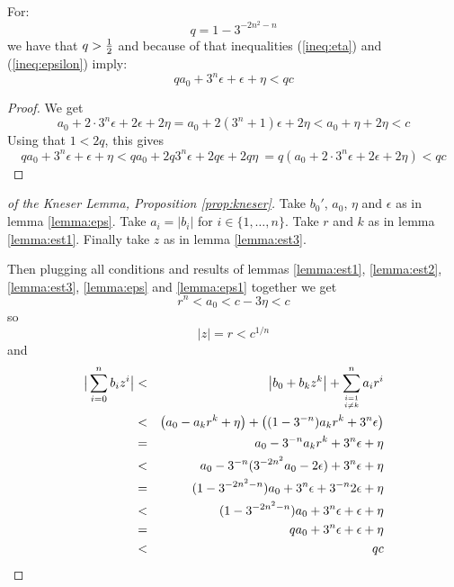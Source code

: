 \begin{lemma}\label{lemma:eps1}
For:
$$q = 1 - 3^{-2n^2-n}$$
we have that $q > {1\over 2}$ and because of that
inequalities (\ref{ineq:eta}) and (\ref{ineq:epsilon}) imply:
$$q a_0 + 3^n \epsilon + \epsilon + \eta < qc$$
\end{lemma}
\begin{proof}
We get
$$a_0 + 2\cdot 3^n\epsilon + 2\epsilon + 2\eta = a_0 + 2(3^n + 1)\epsilon + 2\eta < a_0 + \eta + 2\eta < c$$
Using that $1 < 2q$, this gives
$$q a_0 + 3^n\epsilon + \epsilon + \eta < q a_0 + 2q 3^n\epsilon + 2q \epsilon + 2q \eta\
= q (a_0 + 2\cdot 3^n\epsilon + 2\epsilon + 2\eta) < qc $$
\end{proof}

\begin{proof}[of the Kneser Lemma, Proposition \ref{prop:kneser}]
Take $b_0'$, $a_0$, $\eta$ and $\epsilon$ as in lemma \ref{lemma:eps}.  Take $a_i = |b_i|$
for $i\in\{1,\ldots,n\}$.
Take $r$ and $k$ as in lemma \ref{lemma:est1}.  Finally take $z$ as in lemma \ref{lemma:est3}.

Then plugging all conditions and results of lemmas \ref{lemma:est1}, \ref{lemma:est2}, \ref{lemma:est3},
\ref{lemma:eps} and \ref{lemma:eps1} together we get
$$r^n < a_0 < c - 3\eta < c$$
so
$$|z| = r < c^{1/n}$$
and
\begin{eqnarray*}
\big|\sum_{i=0}^n b_i z^i\big| &<& \left|b_0 + b_k z^k\right| + \sum_{i=1\atop i\ne k}^n a_i r^i\\
&<& \left(a_0 - a_k r^k + \eta\right) + \left((1 - 3^{-n}) a_k r^k + 3^n\epsilon\right)\\
&=& a_0 - 3^{-n} a_k r^k + 3^n\epsilon + \eta\\
&<& a_0 - 3^{-n} (3^{-2n^2} a_0 - 2\epsilon) + 3^n\epsilon + \eta\\
&=& (1 - 3^{-2n^2-n}) a_0 + 3^n\epsilon + 3^{-n} 2\epsilon +\eta\\
&<& (1 - 3^{-2n^2-n}) a_0 + 3^n\epsilon + \epsilon + \eta\\
&=& q a_0 + 3^n\epsilon + \epsilon + \eta\\
&<& q c
\end{eqnarray*}
\end{proof}

